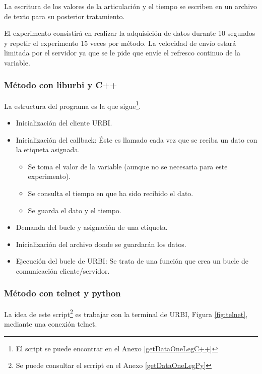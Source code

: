 \documentclass[12pt,a4paper,final,twoside]{article}
\begin{document}
La escritura de los valores de la articulación y el tiempo se escriben en un archivo de texto para su posterior tratamiento.

El experimento consistirá en realizar la adquisición de datos durante 10 segundos y repetir el experimento 15 veces por método. La velocidad de envío estará limitada por el servidor ya que se le pide que envíe el refresco continuo de la variable.

\subsubsection{Método con liburbi y C++}

La estructura del programa es la que sigue\footnote{El script se puede encontrar en el Anexo \ref{getDataOneLegC++}}. 

\begin{itemize}
\item Inicialización del cliente URBI.
\item Inicialización del callback: Éste es llamado cada vez que se reciba un dato con la etiqueta asignada. 
\begin{itemize}
\item Se toma el valor de la variable (aunque no se necesaria para este experimento).
\item Se consulta el tiempo en que ha sido recibido el dato.
\item Se guarda el dato y el tiempo.
\end{itemize}
\item Demanda del bucle y asignación de una etiqueta.
\item Inicialización del archivo donde se guardarán los datos.
\item Ejecución del bucle de URBI: Se trata de una función que crea un bucle de comunicación cliente/servidor. 
\end{itemize}

\subsubsection{Método con telnet y python}
La idea de este script\footnote{Se puede consultar el scrript en el Anexo \ref{getDataOneLegPy}} es trabajar con la terminal de URBI, Figura \ref{fig:telnet},  mediante una conexión telnet.
\end{document}

